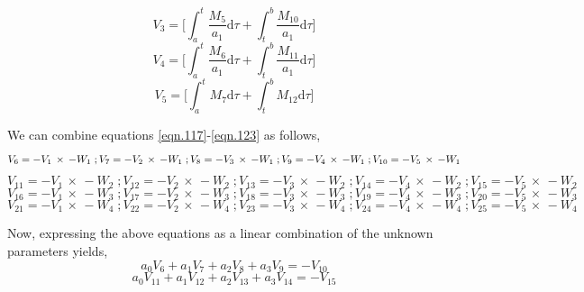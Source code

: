 \documentclass[letterpaper%
, twoside%
, 12pt%
,memoire%
, english%
,creativecommons,hyperref%
]{thETS}
\theoremstyle{newThmStyle}
\begin{document}
\begin{equation}\label{eqn.122}
V_{3} = \bigg[\int_{a}^{t}\frac{M_{5}}{a_{1}} \mathrm{d}\tau + \int_{t}^{b}\frac{M_{10}}{a_{1}} \mathrm{d}\tau \bigg]
\end{equation}
\begin{equation}\label{eqn.122.5}
V_{4} = \bigg[\int_{a}^{t}\frac{M_{6}}{a_{1}} \mathrm{d}\tau + \int_{t}^{b}\frac{M_{11}}{a_{1}} \mathrm{d}\tau \bigg]
\end{equation}
\begin{equation}\label{eqn.123}
V_{5} = \bigg[\int_{a}^{t} M_{7} \mathrm{d}\tau + \int_{t}^{b} M_{12} \mathrm{d}\tau \bigg]
\end{equation}

We can combine equations \eqref{eqn.117}-\eqref{eqn.123} as follows,
\begin{equation}\label{eqn.124}
V_{6} = -V_{1}\, \times \,-W_{1}\;; V_{7} = -V_{2}\, \times \,-W_{1}\;; V_{8} = -V_{3}\, \times \,-W_{1}\;;\\ V_{9} = -V_{4}\, \times \,-W_{1}\;; V_{10} = -V_{5}\, \times \,-W_{1}
\end{equation}
\begin{equation}\label{eqn.125}
V_{11} = -V_{1}\, \times \,-W_{2}\;; V_{12} = -V_{2}\, \times \,-W_{2}\;; V_{13} = -V_{3}\, \times \,-W_{2}\;; V_{14} = -V_{4}\, \times \,-W_{2}\;; V_{15} = -V_{5}\, \times \,-W_{2}
\end{equation}
\begin{equation}\label{eqn.126}
V_{16} = -V_{1}\, \times \,-W_{3}\;; V_{17} = -V_{2}\, \times \,-W_{3}\;; V_{18} = -V_{3}\, \times \,-W_{3}\;; V_{19} = -V_{4}\, \times \,-W_{3}\;; V_{20} = -V_{5}\, \times \,-W_{3}
\end{equation}
\begin{equation}\label{eqn.126.5}
V_{21} = -V_{1}\, \times \,-W_{4}\;; V_{22} = -V_{2}\, \times \,-W_{4}\;; V_{23} = -V_{3}\, \times \,-W_{4}\;; V_{24} = -V_{4}\, \times \,-W_{4}\;; V_{25} = -V_{5}\, \times \,-W_{4}
\end{equation}
\par Now, expressing the above equations as a linear combination of the unknown parameters yields,
\begin{equation}\label{eqn.127}
a_{0} V_{6} + a_{1}V_{7} + a_{2}V_{8} + a_{3}V_{9} = -V_{10}
\end{equation}
\begin{equation}\label{eqn.128}
a_{0} V_{11} + a_{1}V_{12} + a_{2}V_{13} + a_{3}V_{14} = -V_{15}
\end{equation}
\end{document}
